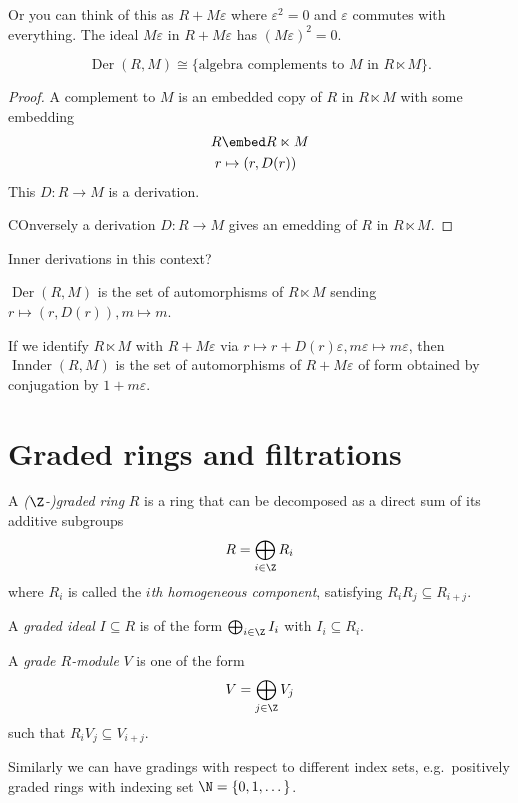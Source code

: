 \documentclass[a4paper]{article}
\DeclareMathOperator{\Der}{Der}
\DeclareMathOperator{\Innder}{Innder}
\begin{document}
Or you can think of this as \(R + M\varepsilon\) where \(\varepsilon^2 = 0\) and \(\varepsilon\) commutes with everything. The ideal \(M\varepsilon\) in \(R + M\varepsilon\) has \((M\varepsilon)^2 = 0\).

\begin{lemma}
  \[
    \Der(R, M) \cong \{\text{algebra complements to \(M\) in } R \ltimes M\}.
  \]
\end{lemma}

\begin{proof}
  A complement to \(M\) is an embedded copy of \(R\) in \(R \ltimes M\) with some embedding
  \begin{align*}
    R &\embed R \ltimes M \\
    r &\mapsto (r, D(r))
  \end{align*}
  This \(D: R \to M\) is a derivation.

  COnversely a derivation \(D: R \to M\) gives an emedding of \(R\) in \(R \ltimes M\).
\end{proof}

Inner derivations in this context?

\begin{corollary}
  \(\Der(R, M)\) is the set of automorphisms of \(R \ltimes M\) sending \(r \mapsto (r, D(r)), m \mapsto m\).

  If we identify \(R \ltimes M\) with \(R + M\varepsilon\) via \(r \mapsto r + D(r)\varepsilon, m\varepsilon \mapsto m\varepsilon\), then \(\Innder(R, M)\) is the set of automorphisms of \(R + M\varepsilon\) of form obtained by conjugation by \(1 + m\varepsilon\).
\end{corollary}

\section{Graded rings and filtrations}

\begin{definition}
  A \emph{(\(\Z\)-)graded ring} \(R\) is a ring that can be decomposed as a direct sum of its additive subgroups
  \[
    R = \bigoplus_{i \in \Z} R_i
  \]
  where \(R_i\) is called the \emph{\(i\)th homogeneous component}, satisfying \(R_iR_j \subseteq R_{i + j}\).

  A \emph{graded ideal} \(I \subseteq R\)  is of the form \(\bigoplus_{i \in \Z} I_i\) with \(I_i \subseteq R_i\).

  A \emph{grade \(R\)-module} \(V\) is one of the form
  \[
    V = \bigoplus_{j \in \Z} V_j
  \]
  such that \(R_iV_j \subseteq V_{i + j}\).

  Similarly we can have gradings with respect to different index sets, e.g.\ positively graded rings with indexing set \(\N = \{0, 1, \dots \}\).
\end{definition}
\end{document}
